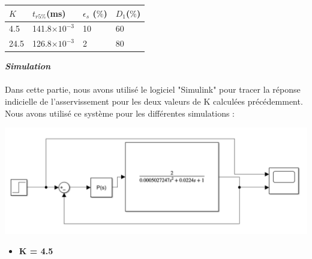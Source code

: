 \documentclass[12pt]{article}
\begin{document}
\begin{center}
    \begin{tabular}{ |p{3cm}|p{3cm}|p{3cm}|p{3cm}|}

        \hline
        $K$ & $t_{r5\%}$(ms) & $\epsilon_s$ ($\%$)&$D_1$($\%$)\\
        \hline
        4.5 & 141.8$\times 10^{-3}$ & 10 & 60\\
        24.5 & 126.8$\times10^{-3}$ & 2 & 80\\ 
        
        \hline
        \end{tabular}
    \end{center}
\Large \textit{ \textbf{Simulation}}
\\\\\normalsize Dans cette partie, nous avons utilisé le logiciel "Simulink" pour tracer la réponse indicielle de
l’asservissement pour les deux valeurs de K calculées précédemment. Nous avons utilisé ce système
pour les différentes simulations : 
\begin{center}
    \includegraphics[width = 15 cm]{TP2 Simulink/Syst_2/Syst_2_Simunlink_P.png}
\end{center}
\begin{itemize}
    \item \bf \large K = 4.5
\end{itemize}
\end{document}
